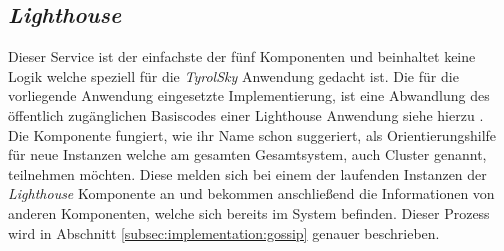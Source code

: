 \subsection{\textit{Lighthouse}}
\label{subsec:implementation:lighthouse}
Dieser Service ist der einfachste der fünf Komponenten und beinhaltet keine Logik welche speziell für die \textit{TyrolSky} Anwendung gedacht ist. Die für die vorliegende Anwendung eingesetzte Implementierung, ist eine Abwandlung des öffentlich zugänglichen Basiscodes einer Lighthouse Anwendung siehe hierzu \cite{lighthouse}. \\
Die Komponente fungiert, wie ihr Name schon suggeriert, als Orientierungshilfe für neue Instanzen welche am gesamten Gesamtsystem, auch Cluster genannt, teilnehmen möchten. Diese melden sich bei einem der laufenden Instanzen der \textit{Lighthouse} Komponente an und bekommen anschließend die Informationen von anderen Komponenten, welche sich bereits im System befinden. Dieser Prozess wird in Abschnitt \ref{subsec:implementation:gossip} genauer beschrieben.

